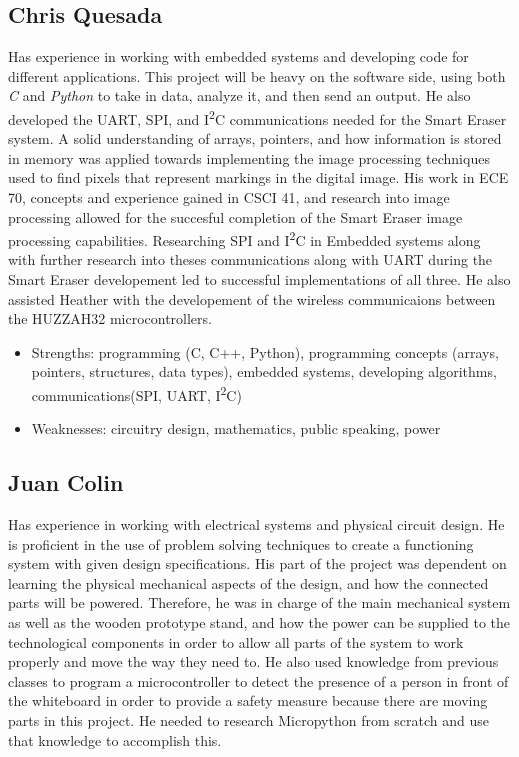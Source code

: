  \subsection{Chris Quesada}
Has experience in working with embedded systems and developing code for different applications. This project will be heavy on the software side, using both \textit{C} and \textit{Python} to take in data, analyze it, and then send an output.  He also developed the UART, SPI, and I\textsuperscript{2}C communications needed for the Smart Eraser system. A solid understanding  of arrays, pointers, and how information is stored in memory was applied towards implementing the  image processing techniques used to find pixels that represent markings in the digital image. His work in ECE 70, concepts and experience gained in CSCI 41, and research into image processing allowed for the succesful completion of the Smart Eraser  image processing capabilities. Researching SPI and I\textsuperscript{2}C in Embedded systems along with further research into theses communications along with UART during the Smart Eraser developement led to successful implementations of all three. He also assisted Heather with the developement of the wireless communicaions between the HUZZAH32 microcontrollers.
\begin{itemize}
	\item Strengths: programming (C, C++, Python),  programming concepts (arrays, pointers, structures, data types), embedded systems, developing algorithms, communications(SPI, UART, I\textsuperscript{2}C)
	
	\item Weaknesses: circuitry design, mathematics, public speaking, power
\end{itemize} \par
 \subsection{Juan Colin}
  Has experience in working with electrical systems and physical circuit design. He is proficient in the use of problem solving techniques to create a functioning system with given design specifications. His part of the project was dependent on learning the physical mechanical aspects of the design, and how the connected parts will be powered. Therefore, he was in charge of the main mechanical system as well as the wooden prototype stand, and how the power can be supplied to the technological components in order to allow all parts of the system to work properly and move the way they need to. He also used knowledge from previous classes to program a microcontroller to detect the presence of a person in front of the whiteboard in order to provide a safety measure because there are moving parts in this project. He needed to research Micropython from scratch and use that knowledge to accomplish this.
  
